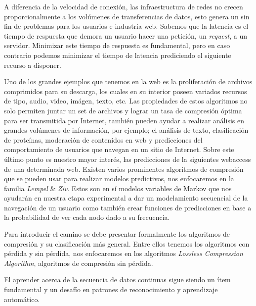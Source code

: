 A diferencia de la velocidad de conexión, las infraestructura de redes no crecen proporcionalmente a los volúmenes de transferencias de datos, esto genera un sin fin de problemas para los usuarios e industria web. Sabemos que la latencia es el tiempo de respuesta que demora un usuario hacer una petición, un \emph{request}, a un servidor. Minimizar este tiempo de respuesta es fundamental, pero en caso contrario podemos minimizar el tiempo de latencia prediciendo el siguiente recurso a disponer.
 
Uno de los grandes ejemplos que tenemos en la web es la proliferación de archivos comprimidos para su descarga, los cuales en su interior poseen variados recursos de tipo, audio, video, imágen, texto, etc. Las propiedades de estos algoritmos no solo permiten juntar un set de archivos y lograr un tasa de compresión óptima para ser transmitida por Internet, también pueden ayudar a realizar análisis en grandes volúmenes de información, por ejemplo; el análisis de texto, clasificación de proteínas, moderación de contenidos en web y predicciones del comportamiento de usuarios que navegan en un sitio de Internet. Sobre este último punto es nuestro mayor interés, las predicciones de la siguientes webaccess de una determinada web. Existen varios prominentes algoritmos de compresión que se pueden usar para realizar modelos predictivos, nos enfocaremos en la familia \emph{Lempel} {\&} \emph{Ziv}. Estos son en sí modelos variables de Markov que nos ayudarán en nuestra etapa experimental a dar un modelamiento secuencial de la navegación de un usuario como también crear funciones de predicciones en base a la probabilidad de ver cada nodo dado a su frecuencia.

Para introducir el camino se debe presentar formalmente los algoritmos de compresión y su clasificación más general. Entre ellos tenemos los algoritmos con pérdida y sin pérdida, nos enfocaremos en los algoritmos \emph{Lossless Compression Algorithm}, algoritmos de compresión sin pérdida.


El aprender acerca de la secuencia de datos continuas sigue siendo un ítem fundamental y un desafío en patrones de reconocimiento y aprendizaje automático.





